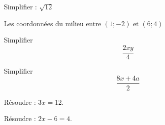 
\begin{MentalActivity}

\begin{mental}
    
            Simplifier : \( \sqrt{12}\)

\end{mental}

\begin{mental}
            Les coordonnées du milieu entre \( (1;-2)\) et \( (6;4)\)
\end{mental}

\begin{mental}
            Simplifier 
            \begin{equation*}
                \frac{ 2xy }{ 4 }
            \end{equation*}
\end{mental}

\begin{mental}
            Simplifier
            \begin{equation*}
                \frac{ 8x+4a }{ 2 }
            \end{equation*}
\end{mental}

\begin{mental}
            Résoudre : \( 3x=12\).
\end{mental}

\begin{mental}
            Résoudre : \( 2x-6=4\).


\end{mental}


\end{MentalActivity}
